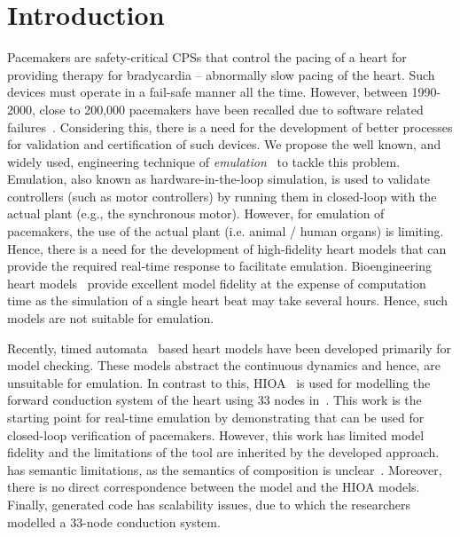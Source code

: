 \section{Introduction}

Pacemakers are safety-critical \acp{CPS} that control the pacing of a
heart for providing therapy for bradycardia -- abnormally slow pacing of
the heart.  Such devices must operate in a fail-safe manner all the
time. However, between 1990-2000, close to 200,000 pacemakers have been
recalled due to software related
failures~\cite{alemzadeh13}. Considering this, there is a need for the
development of better processes for validation and certification of such
devices. We propose the well known, and widely used, engineering
technique of \emph{emulation}~\cite{patel2015survey} to tackle this
problem. Emulation, also known as hardware-in-the-loop simulation, is
used to validate controllers (such as motor controllers) by running them
in closed-loop with the actual plant (e.g., the synchronous motor).
However, for emulation of pacemakers, the use of the actual plant
(i.e. animal / human organs) is limiting.  Hence, there is a need for
the development of high-fidelity heart models that can provide the
required real-time response to facilitate emulation. Bioengineering
heart models~\cite{Trayanova2014} provide excellent model fidelity at
the expense of computation time as the simulation of a single heart beat
may take several hours. Hence, such models are not suitable for
emulation.

Recently, timed automata~\cite{zhihao12} based heart models have been
developed primarily for model checking. These models abstract the
continuous dynamics and hence, are unsuitable for emulation.  In
contrast to this, \acf{HIOA}~\cite{alur2015book, raskin05} is used
for modelling the forward conduction system of the heart using 33 nodes
in~\cite{chen14}. This work is the starting point for real-time
emulation by demonstrating that \simulink can be used for closed-loop
verification of pacemakers. However, this work has limited model
fidelity and the limitations of the tool \simulink are inherited by the
developed approach.  \simulink has semantic limitations, as the
semantics of composition is unclear~\cite{need-some-ref}.  Moreover,
there is no direct correspondence between the \simulink model and the
\ac{HIOA} models. Finally, \simulink generated code has scalability
issues, due to which the researchers modelled a 33-node conduction
system.


